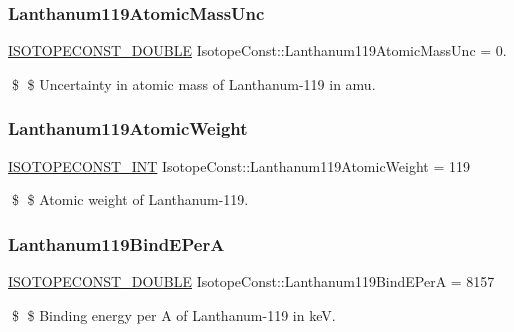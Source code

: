 \subsubsection{\texorpdfstring{Lanthanum119\+Atomic\+Mass\+Unc}{Lanthanum119AtomicMassUnc}}
{\footnotesize\ttfamily \mbox{\hyperlink{group___isotope_const-_macros_ga8f45a7272ce02c0b4c65c44636ed719a}{I\+S\+O\+T\+O\+P\+E\+C\+O\+N\+S\+T\+\_\+\+D\+O\+U\+B\+LE}} Isotope\+Const\+::\+Lanthanum119\+Atomic\+Mass\+Unc = 0.}

\$ \$ Uncertainty in atomic mass of Lanthanum-\/119 in amu. \mbox{\label{group___isotope_const-_lanthanum-_la119_gac6b2db5943cb24b2964bf602e29355e6}} 
\subsubsection{\texorpdfstring{Lanthanum119\+Atomic\+Weight}{Lanthanum119AtomicWeight}}
{\footnotesize\ttfamily \mbox{\hyperlink{group___isotope_const-_macros_ga5f18360b3e99483a35c32d789e62621c}{I\+S\+O\+T\+O\+P\+E\+C\+O\+N\+S\+T\+\_\+\+I\+NT}} Isotope\+Const\+::\+Lanthanum119\+Atomic\+Weight = 119}

\$ \$ Atomic weight of Lanthanum-\/119. \mbox{\label{group___isotope_const-_lanthanum-_la119_gaa01df4c7d0a6bbce7096ee317a3a2aef}} 
\subsubsection{\texorpdfstring{Lanthanum119\+Bind\+E\+PerA}{Lanthanum119BindEPerA}}
{\footnotesize\ttfamily \mbox{\hyperlink{group___isotope_const-_macros_ga8f45a7272ce02c0b4c65c44636ed719a}{I\+S\+O\+T\+O\+P\+E\+C\+O\+N\+S\+T\+\_\+\+D\+O\+U\+B\+LE}} Isotope\+Const\+::\+Lanthanum119\+Bind\+E\+PerA = 8157}

\$ \$ Binding energy per A of Lanthanum-\/119 in keV. \mbox{\label{group___isotope_const-_lanthanum-_la119_ga63efb6c7209c4b046e0e4139fc001515}} 
